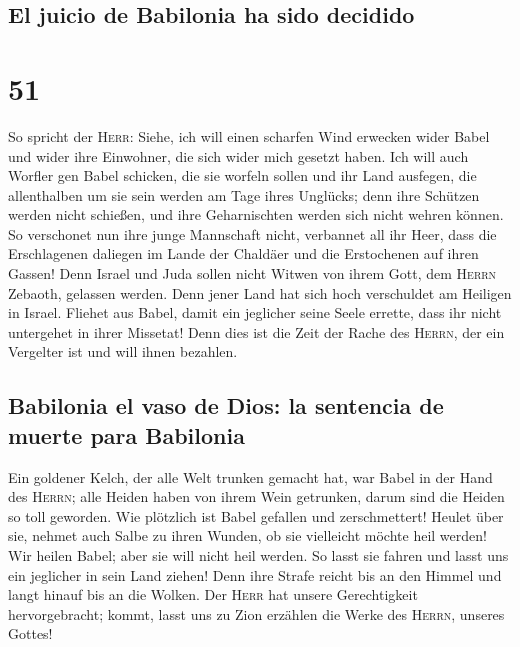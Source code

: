 \hypertarget{el-juicio-de-babilonia-ha-sido-decidido}{%
\subsection{El juicio de Babilonia ha sido
decidido}\label{el-juicio-de-babilonia-ha-sido-decidido}}

\hypertarget{section-50}{%
\section{51}\label{section-50}}

 So spricht der \textsc{Herr}: Siehe, ich will einen
scharfen Wind erwecken wider Babel und wider ihre Einwohner, die sich
wider mich gesetzt haben.  Ich will auch Worfler gen Babel
schicken, die sie worfeln sollen und ihr Land ausfegen, die allenthalben
um sie sein werden am Tage ihres Unglücks;  denn ihre
Schützen werden nicht schießen, und ihre Geharnischten werden sich nicht
wehren können. So verschonet nun ihre junge Mannschaft nicht, verbannet
all ihr Heer,  dass die Erschlagenen daliegen im Lande der
Chaldäer und die Erstochenen auf ihren Gassen!  Denn
Israel und Juda sollen nicht Witwen von ihrem Gott, dem \textsc{Herrn}
Zebaoth, gelassen werden. Denn jener Land hat sich hoch verschuldet am
Heiligen in Israel.  Fliehet aus Babel, damit ein
jeglicher seine Seele errette, dass ihr nicht untergehet in ihrer
Missetat! Denn dies ist die Zeit der Rache des \textsc{Herrn}, der ein
Vergelter ist und will ihnen bezahlen.

\hypertarget{babilonia-el-vaso-de-dios-la-sentencia-de-muerte-para-babilonia}{%
\subsection{Babilonia el vaso de Dios: la sentencia de muerte para
Babilonia}\label{babilonia-el-vaso-de-dios-la-sentencia-de-muerte-para-babilonia}}

 Ein goldener Kelch, der alle Welt trunken gemacht hat,
war Babel in der Hand des \textsc{Herrn}; alle Heiden haben von ihrem
Wein getrunken, darum sind die Heiden so toll geworden. 
Wie plötzlich ist Babel gefallen und zerschmettert! Heulet über sie,
nehmet auch Salbe zu ihren Wunden, ob sie vielleicht möchte heil werden!
 Wir heilen Babel; aber sie will nicht heil werden. So
lasst sie fahren und lasst uns ein jeglicher in sein Land ziehen! Denn
ihre Strafe reicht bis an den Himmel und langt hinauf bis an die Wolken.
 Der \textsc{Herr} hat unsere Gerechtigkeit
hervorgebracht; kommt, lasst uns zu Zion erzählen die Werke des
\textsc{Herrn}, unseres Gottes!

